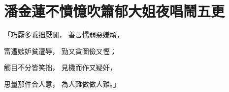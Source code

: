 %

\chapter{潘金蓮不憤憶吹簫\KG 郁大姐夜唱鬧五更}


\begin{showcontents}{}




「巧厭多乖拙厭閒，  善言懦弱惡嫌頑，

富遭嫉妒貧遭辱，  勤又貪圖儉又慳；

觸目不分皆笑拙，  見機而作又疑奸，

思量那件合人意，  為人難做做人難。」


\end{showcontents}
